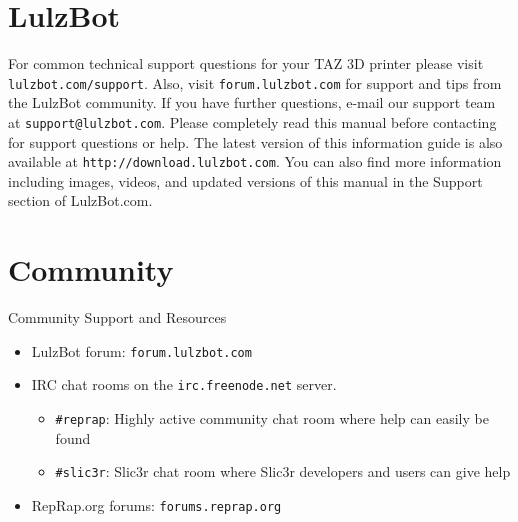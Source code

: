 %
%
%
%
%

\section{LulzBot}
\setlength{\parindent}{0pt}
For common technical support questions for your TAZ 3D printer please visit \texttt{lulzbot.com/support}. Also, visit \texttt{forum.lulzbot.com} for support and tips from the LulzBot community. If you have further questions, e-mail our support team at \texttt{support@lulzbot.com}. Please completely read this manual before contacting for support questions or help. The latest version of this information guide is also available at \texttt{http://download.lulzbot.com}. You can also find more information including images, videos, and updated versions of this manual in the Support section of LulzBot.com.

\section{Community}
Community Support and Resources

\begin{itemize}

\item LulzBot forum: \texttt{forum.lulzbot.com}
\item IRC chat rooms on the \texttt{irc.freenode.net} server.
	\begin{itemize}
	\item \texttt{\#reprap}: Highly active community chat room where help can easily be found
	\item \texttt{\#slic3r}: Slic3r chat room where Slic3r developers and users can give help
	\end{itemize}
\item RepRap.org forums: \texttt{forums.reprap.org}

\end{itemize}
